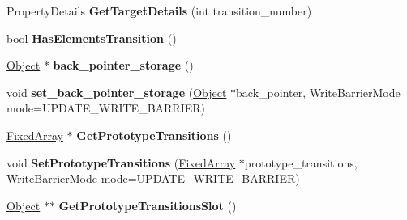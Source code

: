 \begin{DoxyCompactItemize}
\item 
\hypertarget{classv8_1_1internal_1_1_transition_array_a8dfdcaef2b6d41705d2c6b78a156371b}{}Property\+Details {\bfseries Get\+Target\+Details} (int transition\+\_\+number)\label{classv8_1_1internal_1_1_transition_array_a8dfdcaef2b6d41705d2c6b78a156371b}

\item 
\hypertarget{classv8_1_1internal_1_1_transition_array_a0d28c1bee8e9785573775a4bbc93025a}{}bool {\bfseries Has\+Elements\+Transition} ()\label{classv8_1_1internal_1_1_transition_array_a0d28c1bee8e9785573775a4bbc93025a}

\item 
\hypertarget{classv8_1_1internal_1_1_transition_array_a7f3be2519e4561ce237859b5c03d656a}{}\hyperlink{classv8_1_1internal_1_1_object}{Object} $\ast$ {\bfseries back\+\_\+pointer\+\_\+storage} ()\label{classv8_1_1internal_1_1_transition_array_a7f3be2519e4561ce237859b5c03d656a}

\item 
\hypertarget{classv8_1_1internal_1_1_transition_array_a5459598c890459adffd2ce4fbe2ec10d}{}void {\bfseries set\+\_\+back\+\_\+pointer\+\_\+storage} (\hyperlink{classv8_1_1internal_1_1_object}{Object} $\ast$back\+\_\+pointer, Write\+Barrier\+Mode mode=U\+P\+D\+A\+T\+E\+\_\+\+W\+R\+I\+T\+E\+\_\+\+B\+A\+R\+R\+I\+E\+R)\label{classv8_1_1internal_1_1_transition_array_a5459598c890459adffd2ce4fbe2ec10d}

\item 
\hypertarget{classv8_1_1internal_1_1_transition_array_ae4c92847fe409691ab3d197fb7e52033}{}\hyperlink{classv8_1_1internal_1_1_fixed_array}{Fixed\+Array} $\ast$ {\bfseries Get\+Prototype\+Transitions} ()\label{classv8_1_1internal_1_1_transition_array_ae4c92847fe409691ab3d197fb7e52033}

\item 
\hypertarget{classv8_1_1internal_1_1_transition_array_aa8bb8f939ee312089dcba70a82318e3a}{}void {\bfseries Set\+Prototype\+Transitions} (\hyperlink{classv8_1_1internal_1_1_fixed_array}{Fixed\+Array} $\ast$prototype\+\_\+transitions, Write\+Barrier\+Mode mode=U\+P\+D\+A\+T\+E\+\_\+\+W\+R\+I\+T\+E\+\_\+\+B\+A\+R\+R\+I\+E\+R)\label{classv8_1_1internal_1_1_transition_array_aa8bb8f939ee312089dcba70a82318e3a}

\item 
\hypertarget{classv8_1_1internal_1_1_transition_array_a882a82a8f4b83141745e017bf84e765d}{}\hyperlink{classv8_1_1internal_1_1_object}{Object} $\ast$$\ast$ {\bfseries Get\+Prototype\+Transitions\+Slot} ()\label{classv8_1_1internal_1_1_transition_array_a882a82a8f4b83141745e017bf84e765d}


\end{DoxyCompactItemize}

